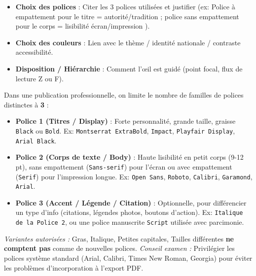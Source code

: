 \documentclass[11pt]{article}
\newcounter{popsec}
\newcounter{popsub}
\newcommand{\courssub}[1]{%
  \stepcounter{popsub}%
  \par\vspace{9pt}\noindent{\popxbold\fontsize{11.5}{13}\selectfont\color{popink}{\color{poporange}\thepopsec.\thepopsub}\hspace{6pt}#1}\par\nopagebreak\vspace{4pt}
}
\begin{document}
\begin{enumerate}
\begin{itemize}
        \item \textbf{Choix des polices} : Citer les 3 polices utilisées et justifier (ex: \og Police à empattement pour le titre = autorité/tradition ; police sans empattement pour le corps = lisibilité écran/impression \fg{}).
        \item \textbf{Choix des couleurs} : Lien avec le thème / identité nationale / contraste accessibilité.
        \item \textbf{Disposition / Hiérarchie} : Comment l'œil est guidé (point focal, flux de lecture Z ou F).
    \end{itemize}
\end{enumerate}

\courssub{Ressources à mobiliser}

\begin{propriete}
Dans une publication professionnelle, on limite le nombre de familles de polices distinctes à \textbf{3} :
\begin{itemize}
    \item \textbf{Police 1 (Titres / Display)} : Forte personnalité, grande taille, graisse \texttt{Black} ou \texttt{Bold}. Ex: \texttt{Montserrat ExtraBold}, \texttt{Impact}, \texttt{Playfair Display}, \texttt{Arial Black}.
    \item \textbf{Police 2 (Corps de texte / Body)} : Haute lisibilité en petit corps (9-12 pt), sans empattement (\texttt{Sans-serif}) pour l'écran ou avec empattement (\texttt{Serif}) pour l'impression longue. Ex: \texttt{Open Sans}, \texttt{Roboto}, \texttt{Calibri}, \texttt{Garamond}, \texttt{Arial}.
    \item \textbf{Police 3 (Accent / Légende / Citation)} : Optionnelle, pour différencier un type d'info (citations, légendes photos, boutons d'action). Ex: \texttt{Italique de la Police 2}, ou une police manuscrite \texttt{Script} utilisée avec parcimonie.
\end{itemize}
\emph{Variantes autorisées :} Gras, Italique, Petites capitales, Tailles différentes \textbf{ne comptent pas} comme de nouvelles polices.
\emph{Conseil examen :} Privilégier les polices système standard (Arial, Calibri, Times New Roman, Georgia) pour éviter les problèmes d'incorporation à l'export PDF.
\end{propriete}
\end{document}
